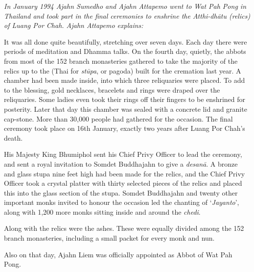 
\emph{In January 1994 Ajahn Sumedho and Ajahn Attapemo went to Wat Pah
Pong in Thailand and took part in the final ceremonies to enshrine the
Atthi-dhātu (relics) of Luang Por Chah. Ajahn Attapemo explains:}

It was all done quite beautifully, stretching over seven days. Each day
there were periods of meditation and Dhamma talks. On the fourth day, 
quietly, the abbots from most of the 152 branch monasteries gathered to
take the majority of the relics up to the (Thai for \emph{stūpa}, or
pagoda) built for the cremation last year. A chamber had been made
inside, into which three reliquaries were placed. To add to the
blessing, gold necklaces, bracelets and rings were draped over the
reliquaries. Some ladies even took their rings off their fingers to be
enshrined for posterity. Later that day this chamber was sealed with a
concrete lid and granite cap-stone. More than 30,000 people had gathered
for the occasion. The final ceremony took place on 16th January, exactly
two years after Luang Por Chah's death. 

His Majesty King Bhumiphol sent his Chief Privy Officer to lead the
ceremony, and sent a royal invitation to Somdet Buddhajahn to give a
\emph{desanā}. A bronze and glass stupa nine feet high had been made for
the relics, and the Chief Privy Officer took a crystal platter with
thirty selected pieces of the relics and placed this into the glass
section of the stupa. Somdet Buddhajahn and twenty other important monks
invited to honour the occasion led the chanting of `\emph{Jayanto}', along
with 1,200 more monks sitting inside and around the \emph{chedi}.

Along with the relics were the ashes. These were equally divided among
the 152 branch monasteries, including a small packet for every monk and
nun.

Also on that day, Ajahn Liem was officially appointed as Abbot of Wat
Pah Pong.

